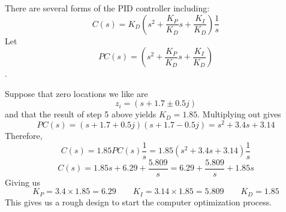 There are several forms of the PID controller including:
\[
C(s) = K_D \left ( s^2+ \frac{K_P}{K_D}s + \frac{K_I}{K_D} \right ) \frac{1}{s}
\]
Let
\[
PC(s) = \left ( s^2+ \frac{K_P}{K_D}s + \frac{K_I}{K_D} \right )
\].

Suppose that zero locations we like are
\[
z_i = (s + 1.7 \pm 0.5j)
\]
and that the result of step 5 above yields $K_D = 1.85$.   Multiplying out gives
\[
PC(s) = (s + 1.7 + 0.5j)(s + 1.7 - 0.5j)  = s^2 + 3.4s + 3.14
\]
Therefore,
\[
C(s) = 1.85 PC(s) \frac{1}{s} = 1.85(s^2 + 3.4s + 3.14)\frac{1}{s}
\]
\[
C(s) = 1.85s + 6.29 + \frac {5.809} {s} = 6.29 + \frac {5.809} {s} + 1.85s
\]
Giving us
\[
K_P = 3.4\times 1.85 = 6.29   \qquad  K_I = 3.14\times1.85 = 5.809 \qquad K_D = 1.85
\]
This gives us a rough design to start the computer optimization process.




